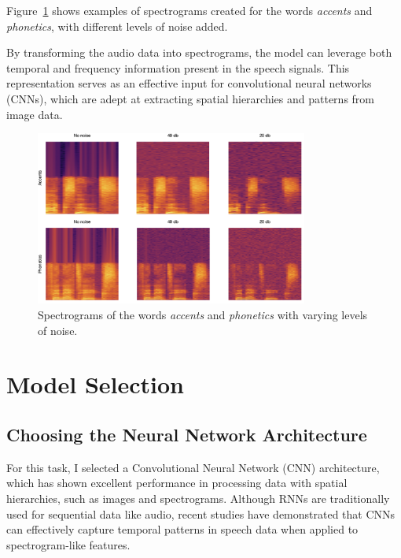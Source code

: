 \documentclass[12pt]{article}
\begin{document}
Figure~\ref{fig:spectrograms} shows examples of spectrograms created for the words \textit{accents} and \textit{phonetics}, with different levels of noise added.

By transforming the audio data into spectrograms, the model can leverage both temporal and frequency information present in the speech signals. This representation serves as an effective input for convolutional neural networks (CNNs), which are adept at extracting spatial hierarchies and patterns from image data.

\begin{figure}[h]
\centering
\includegraphics[width=0.8\textwidth]{spectrograms.png}
\caption{Spectrograms of the words \textit{accents} and \textit{phonetics} with varying levels of noise.}
\label{fig:spectrograms}
\end{figure}

\clearpage




\section{Model Selection}

\subsection{Choosing the Neural Network Architecture}

For this task, I selected a Convolutional Neural Network (CNN) architecture, which has shown excellent performance in processing data with spatial hierarchies, such as images and spectrograms. Although RNNs are traditionally used for sequential data like audio, recent studies have demonstrated that CNNs can effectively capture temporal patterns in speech data when applied to spectrogram-like features.
\end{document}
